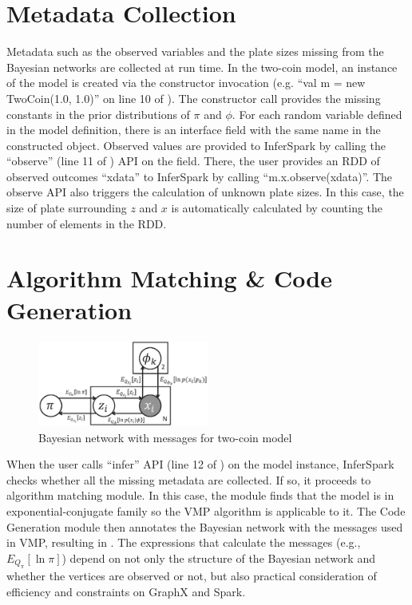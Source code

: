 \section{Metadata Collection}

Metadata such as the observed variables and the plate sizes missing from the
Bayesian networks are collected at run time. In the two-coin
model, an instance of the model is created via the constructor invocation (e.g.
``{\sf val m = new TwoCoin(1.0, 1.0)}'' on line 10 of ). The constructor call provides
the missing constants in the prior distributions of $\pi$ and $\phi$. 
For each random variable defined in the model definition, 
there is an interface field with the
same name in the constructed object. Observed values are provided to InferSpark
by calling the ``{\sf observe}'' (line 11 of ) 
API on the field. 
There, the user provides an RDD of observed outcomes ``{\sf xdata}'' to InferSpark by calling
``{\sf m.x.observe(xdata)}''. The  {\sf observe} API also triggers 
the calculation of unknown plate sizes. 
In this case, the size of plate surrounding $z$ and $x$ is
automatically calculated by counting the number of elements in the RDD.

\section{Algorithm Matching \& Code Generation}

\begin{figure}[h]
\centering
	\includegraphics[width=0.5\textwidth]{figs/two_coins_msg.eps}
	\caption{Bayesian network with messages for two-coin model}
	\label{fig:two_coins_msg}
\end{figure}

When the user calls ``{\sf infer}'' API (line 12 of
) on the model instance, InferSpark checks
whether all the missing metadata are collected. If so, it proceeds to
algorithm matching module. In this case, the module finds that the model is in
exponential-conjugate family so the VMP algorithm is applicable to it. The
Code Generation module then annotates the Bayesian network with the messages used
in VMP, resulting in . The expressions that
calculate the messages (e.g., $E_{Q_\pi}[\ln \pi]$) depend on not only the
structure of the Bayesian network and whether the vertices are observed or
not, but also practical consideration of efficiency and constraints on GraphX and Spark.

